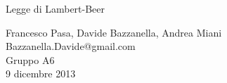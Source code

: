 \begin{center}

     	{\huge Legge di Lambert-Beer \\}
    \vspace{0.5cm}

      	{\large Francesco Pasa, Davide Bazzanella, Andrea Miani} \\
      	{Bazzanella.Davide@gmail.com} \\
		{\large Gruppo A6} \\
	
	\vspace{0.2cm}
      	{\large 9 dicembre 2013}

\end{center}

